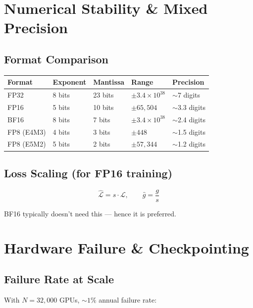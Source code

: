 \documentclass[11pt,a4paper]{article}
\begin{document}
\section{Numerical Stability \& Mixed Precision}

\subsection{Format Comparison}

\begin{center}
\begin{tabular}{lllll}
\toprule
\textbf{Format} & \textbf{Exponent} & \textbf{Mantissa} & \textbf{Range} & \textbf{Precision} \\
\midrule
FP32 & 8 bits & 23 bits & $\pm 3.4 \times 10^{38}$ & $\sim$7 digits \\
FP16 & 5 bits & 10 bits & $\pm 65{,}504$ & $\sim$3.3 digits \\
BF16 & 8 bits & 7 bits & $\pm 3.4 \times 10^{38}$ & $\sim$2.4 digits \\
FP8 (E4M3) & 4 bits & 3 bits & $\pm 448$ & $\sim$1.5 digits \\
FP8 (E5M2) & 5 bits & 2 bits & $\pm 57{,}344$ & $\sim$1.2 digits \\
\bottomrule
\end{tabular}
\end{center}

\subsection{Loss Scaling (for FP16 training)}

$$\hat{\mathcal{L}} = s \cdot \mathcal{L}, \qquad \hat{g} = \frac{g}{s}$$

BF16 typically doesn't need this --- hence it is preferred.

\section{Hardware Failure \& Checkpointing}

\subsection{Failure Rate at Scale}

With $N = 32{,}000$ GPUs, $\sim 1\%$ annual failure rate:
\end{document}
